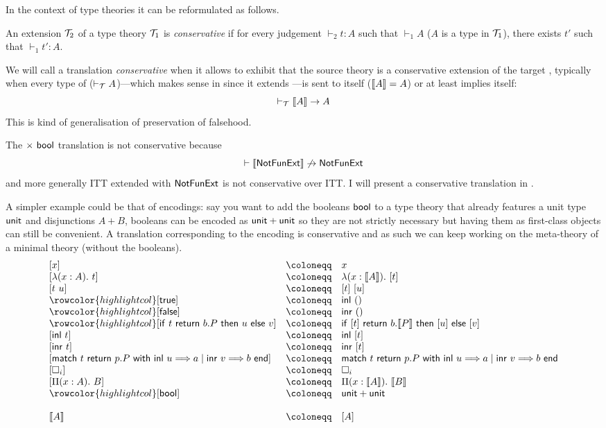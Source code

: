 In the context of type theories it can be reformulated as follows.

\begin{definition}
  An extension \(\mathcal{T}_2\) of a type theory \(\mathcal{T}_1\) is \emph{conservative} if
  for every judgement \(\vdash_2 t : A\) such that \(\vdash_1 A\)
  (\ie \(A\) is a type in \(\mathcal{T}_1\)), there exists \(t'\) such that
  \(\vdash_1 t' : A\).
\end{definition}

We will call a translation \emph{conservative} when it allows to exhibit that
the source theory \cS is a conservative extension of the target \cT, typically
when every type of \cT (\ie \(\vdash_\mathcal{T} A\))---which makes sense in \cS since
it extends \cT---is sent to itself (\(\llbracket A \rrbracket = A\)) or at least implies
itself:
\[
  \vdash_\mathcal{T} \llbracket A \rrbracket \to A
\]
This is kind of generalisation of preservation of falsehood.

The \(\times\ \mathsf{bool}\) translation is not conservative because
\[
  \vdash \llbracket \mathsf{NotFunExt} \rrbracket \not\to \mathsf{NotFunExt}
\]
and more generally \acrshort{ITT} extended with \(\mathsf{NotFunExt}\) is not
conservative over \acrshort{ITT}.
I will present a conservative translation in .

A simpler example could be that of encodings: say you want to add the booleans
\(\mathsf{bool}\) to a type theory that already features a unit type \(\mathsf{unit}\) and
disjunctions \(A + B\), booleans can be encoded as \(\mathsf{unit} + \mathsf{unit}\) so they
are not strictly necessary but having them as first-class objects can still be
convenient. A translation corresponding to the encoding is conservative and as
such we can keep working on the meta-theory of a minimal theory (without
the booleans).
%
\[
\begin{array}{lcl}
  [ x ] &\coloneqq& x \\ \relax
  [ \lambda (x : A).\ t ] &\coloneqq& \lambda (x : \transl{A}).\ [t] \\
  \relax
  [ t\ u ] &\coloneqq& [t]\ [u] \\
  \rowcolor{highlightcol} \relax
  [ \ttrue ] &\coloneqq& \inl\ \tunit \\
  \rowcolor{highlightcol} \relax
  [ \ffalse ] &\coloneqq& \inr\ \tunit \\
  \rowcolor{highlightcol} \relax
  [ \tif{t}{b. P}{u}{v} ] &\coloneqq& \tif{[t]}{b. \transl{P}}{[u]}{[v]} \\
  \relax
  [ \inl\ t ] &\coloneqq& \inl\ [t] \\ \relax
  [ \inr\ t ] &\coloneqq& \inr\ [t] \\ \relax
  [ \pmatch{t}{p. P}{\inl\ u \mto a \mid \inr\ v \mto b} ] &\coloneqq&
  \pmatch{t}{p. P}{\inl\ u \mto a \mid \inr\ v \mto b} \\ \relax
  [ \Ty{i} ] &\coloneqq& \Ty{i} \\ \relax
  [ \Pi (x : A).\ B ] &\coloneqq& \Pi (x : \transl{A}).\ \transl{B} \\
  \rowcolor{highlightcol} \relax
  [ \bool ] &\coloneqq& \unit + \unit \\ \relax
  \\
  \transl{A} &\coloneqq& [A]
\end{array}
\]